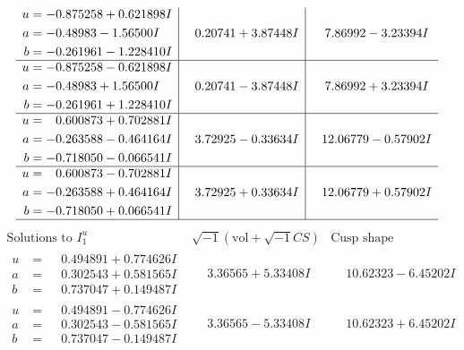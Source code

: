 \documentclass[1p]{elsarticle_modified}
\theoremstyle{definition}
\newcommand{\I}{\sqrt{-1}}
\begin{document}
$$\begin{array}{c|c|c}
\begin{aligned}
u &= -0.875258 + 0.621898 I \\
a &= -0.48983 - 1.56500 I \\
b &= -0.261961 - 1.228410 I\end{aligned}
 & \phantom{-}0.20741 + 3.87448 I & \phantom{-}7.86992 - 3.23394 I \\ \hline\begin{aligned}
u &= -0.875258 - 0.621898 I \\
a &= -0.48983 + 1.56500 I \\
b &= -0.261961 + 1.228410 I\end{aligned}
 & \phantom{-}0.20741 - 3.87448 I & \phantom{-}7.86992 + 3.23394 I \\ \hline\begin{aligned}
u &= \phantom{-}0.600873 + 0.702881 I \\
a &= -0.263588 - 0.464164 I \\
b &= -0.718050 - 0.066541 I\end{aligned}
 & \phantom{-}3.72925 - 0.33634 I & \phantom{-}12.06779 - 0.57902 I \\ \hline\begin{aligned}
u &= \phantom{-}0.600873 - 0.702881 I \\
a &= -0.263588 + 0.464164 I \\
b &= -0.718050 + 0.066541 I\end{aligned}
 & \phantom{-}3.72925 + 0.33634 I & \phantom{-}12.06779 + 0.57902 I\\
 \hline 
 \end{array}$$\newpage$$\begin{array}{c|c|c}  
\text{Solutions to }I^u_{1}& \I (\text{vol} + \sqrt{-1}CS) & \text{Cusp shape}\\
 \hline 
\begin{aligned}
u &= \phantom{-}0.494891 + 0.774626 I \\
a &= \phantom{-}0.302543 + 0.581565 I \\
b &= \phantom{-}0.737047 + 0.149487 I\end{aligned}
 & \phantom{-}3.36565 + 5.33408 I & \phantom{-}10.62323 - 6.45202 I \\ \hline\begin{aligned}
u &= \phantom{-}0.494891 - 0.774626 I \\
a &= \phantom{-}0.302543 - 0.581565 I \\
b &= \phantom{-}0.737047 - 0.149487 I\end{aligned}
 & \phantom{-}3.36565 - 5.33408 I & \phantom{-}10.62323 + 6.45202 I \\ \hline\begin{aligned}

\end{aligned}
\end{array}$$
\end{document}
